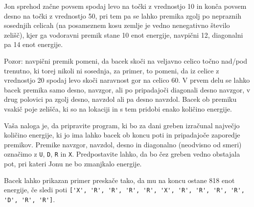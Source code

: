 \documentclass[arhiv]{../izpit}
\begin{document}
Jon sprehod začne povsem spodaj levo na točki z 
vrednostjo 10 in konča povsem desno na točki 
z vrednostjo 50, pri tem pa se lahko premika 
zgolj po nepraznih sosednjih celicah (na posameznem 
kosu zemlje je vedno nenegativno število zelišč), 
kjer ga vodoravni premik stane 10 enot energije, 
navpični 12, diagonalni pa 14 enot energije.

Pozor: navpični premik pomeni, da bacek skoči na veljavno celico točno nad/pod trenutno, ki torej nikoli ni sosednja, za primer, to pomeni, da iz celice z vrednostjo 20 spodaj levo skoči naravnost gor na celico 60. 
V prvem delu se lahko bacek 
premika samo desno, navzgor, ali po pripadajoči 
diagonali desno navzgor, v drug polovici pa zgolj desno, navzdol
ali pa desno navzdol. 
Bacek ob premiku vsakič poje zelišča, ki so 
na lokaciji in s tem pridobi enako količino energije.

Vaša naloga je, da pripravite program, ki bo za dani greben
izračunal največjo količino energije, ki jo ima lahko bacek 
ob koncu poti in pripadajoče zaporedje premikov. Premike navzgor, navzdol, desno in diagonalno (neodvisno od smeri) označimo z \verb|U|, \verb|D|, \verb|R| in \verb|X|.
Predpostavite lahko, da bo čez greben vedno obstajala pot, pri kateri Jonu ne bo zmanjkalo energije.

Bacek lahko prikazan primer preskače tako, da mu na koncu ostane 818 enot energije, če sledi poti \verb|['X', 'R', 'R', 'R', 'R', 'X', 'R', 'R', 'R', 'R', 'D', 'R', 'R']|.
\end{document}
